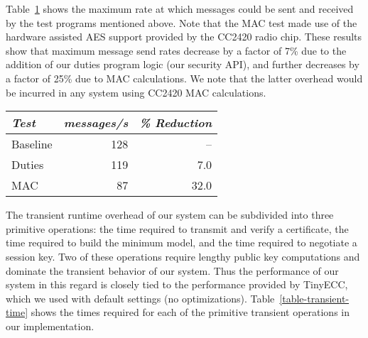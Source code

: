 Table~\ref{table-steady-state} shows the maximum rate at which messages
could be sent and received by the test programs mentioned above. Note
that the MAC test made use of the hardware assisted AES support provided
by the CC2420 radio chip. These results show that maximum message send
rates decrease by a factor of 7\% due to the addition of our duties
program logic (our security API), and further decreases by a factor of
25\% due to MAC calculations. We note that the latter overhead would be
incurred in any system using CC2420 MAC calculations.

\begin{table}[!t]
  \newcommand\T{\rule{0pt}{2.1ex}}
  \centering
  {
  \begin{tabular}{|l|r|r|} \hline
    \textit{Test} \T & \textit{messages/s} & \textit{\% Reduction} \\
    \hline \hline

    Baseline \T & 128 &   -- \\ \hline 
    Duties   \T & 119 &  7.0 \\ \hline
    MAC      \T &  87 & 32.0 \\ \hline
  \end{tabular}
  }
  \label{table-steady-state}
\end{table}

The transient runtime overhead of our system can be subdivided into
three primitive operations: the time required to transmit and verify a
certificate, the time required to build the minimum model, and the time
required to negotiate a session key. Two of these operations require
lengthy public key computations and dominate the transient behavior of
our system. Thus the performance of our system in this regard is closely
tied to the performance provided by TinyECC, which we used with default
settings (no optimizations). Table~\ref{table-transient-time} shows the
times required for each of the primitive transient operations in our
implementation.


